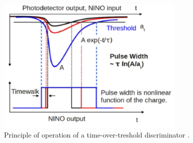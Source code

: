 \begin{figure}[htbp]
\begin{center}
\includegraphics[width=9cm]{../Pictures/Chapter_3/TOT.pdf}
\end{center}
\caption[Time-over-threshold]{Principle of operation of a time-over-treshold discriminator \cite{Gundacker2014}.}
\label{fig:tot}
\end{figure}

